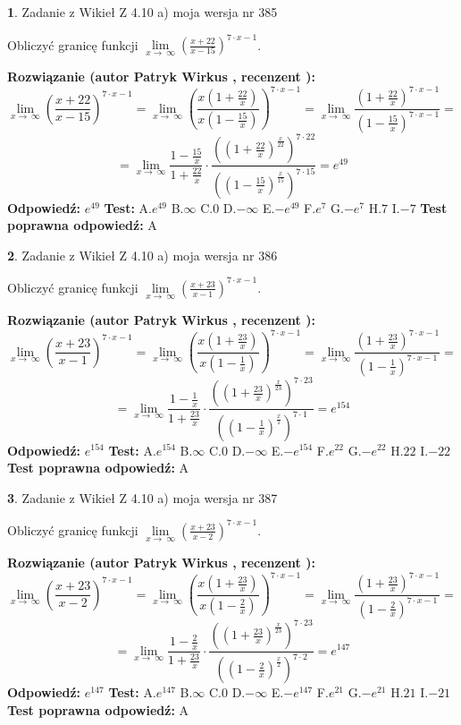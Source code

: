 \documentclass[12pt, a4paper]{article}
\theoremstyle{definition} %
\newtheorem{zad}{}
\newcommand{\zadStart}[1]{\begin{zad}#1\newline}
\newcommand{\zadStop}{\end{zad}}
\newcommand{\rozwStart}[2]{\noindent \textbf{Rozwiązanie (autor #1 , recenzent #2): }\newline}
\newcommand{\rozwStop}{\newline}
\newcommand{\odpStart}{\noindent \textbf{Odpowiedź:}\newline}
\newcommand{\odpStop}{\newline}
\newcommand{\testStart}{\noindent \textbf{Test:}\newline}
\newcommand{\testStop}{\newline}
\newcommand{\kluczStart}{\noindent \textbf{Test poprawna odpowiedź:}\newline}
\newcommand{\kluczStop}{\newline}
\begin{document}
\zadStart{Zadanie z Wikieł Z 4.10 a) moja wersja nr 385}

Obliczyć granicę funkcji  $\lim\limits_{x\to\ \infty}(\frac{x+22}{x-15})^{7\cdot x-1}$.
\zadStop
\rozwStart{Patryk Wirkus}{}
$$\lim\limits_{x\to\ \infty}(\frac{x+22}{x-15})^{7\cdot x-1} = \lim\limits_{x\to\ \infty}(\frac{x(1+\frac{22}{x})}{x(1-\frac{15}{x})})^{7\cdot x-1}=\lim\limits_{x\to\ \infty}\frac{(1+\frac{22}{x})^{7\cdot x-1}}{(1-\frac{15}{x})^{7\cdot x-1}}=$$
$$=\lim\limits_{x\to\ \infty}\frac{1-\frac{15}{x}}{1+\frac{22}{x}}\cdot\frac{((1+\frac{22}{x})^{\frac{x}{22}})^{7\cdot22}}{((1-\frac{15}{x})^{\frac{x}{15}})^{7\cdot15}}=e^{49}$$
\rozwStop
\odpStart
$e^{49}$
\odpStop
\testStart
A.$e^{49}$ B.$\infty$ C.$0$ D.$-\infty$ E.$-e^{49}$
F.$e^{7}$ G.$-e^{7}$
H.$7$
I.$-7$
\testStop
\kluczStart
A
\kluczStop



\zadStart{Zadanie z Wikieł Z 4.10 a) moja wersja nr 386}

Obliczyć granicę funkcji  $\lim\limits_{x\to\ \infty}(\frac{x+23}{x-1})^{7\cdot x-1}$.
\zadStop
\rozwStart{Patryk Wirkus}{}
$$\lim\limits_{x\to\ \infty}(\frac{x+23}{x-1})^{7\cdot x-1} = \lim\limits_{x\to\ \infty}(\frac{x(1+\frac{23}{x})}{x(1-\frac{1}{x})})^{7\cdot x-1}=\lim\limits_{x\to\ \infty}\frac{(1+\frac{23}{x})^{7\cdot x-1}}{(1-\frac{1}{x})^{7\cdot x-1}}=$$
$$=\lim\limits_{x\to\ \infty}\frac{1-\frac{1}{x}}{1+\frac{23}{x}}\cdot\frac{((1+\frac{23}{x})^{\frac{x}{23}})^{7\cdot23}}{((1-\frac{1}{x})^{\frac{x}{1}})^{7\cdot1}}=e^{154}$$
\rozwStop
\odpStart
$e^{154}$
\odpStop
\testStart
A.$e^{154}$ B.$\infty$ C.$0$ D.$-\infty$ E.$-e^{154}$
F.$e^{22}$ G.$-e^{22}$
H.$22$
I.$-22$
\testStop
\kluczStart
A
\kluczStop



\zadStart{Zadanie z Wikieł Z 4.10 a) moja wersja nr 387}

Obliczyć granicę funkcji  $\lim\limits_{x\to\ \infty}(\frac{x+23}{x-2})^{7\cdot x-1}$.
\zadStop
\rozwStart{Patryk Wirkus}{}
$$\lim\limits_{x\to\ \infty}(\frac{x+23}{x-2})^{7\cdot x-1} = \lim\limits_{x\to\ \infty}(\frac{x(1+\frac{23}{x})}{x(1-\frac{2}{x})})^{7\cdot x-1}=\lim\limits_{x\to\ \infty}\frac{(1+\frac{23}{x})^{7\cdot x-1}}{(1-\frac{2}{x})^{7\cdot x-1}}=$$
$$=\lim\limits_{x\to\ \infty}\frac{1-\frac{2}{x}}{1+\frac{23}{x}}\cdot\frac{((1+\frac{23}{x})^{\frac{x}{23}})^{7\cdot23}}{((1-\frac{2}{x})^{\frac{x}{2}})^{7\cdot2}}=e^{147}$$
\rozwStop
\odpStart
$e^{147}$
\odpStop
\testStart
A.$e^{147}$ B.$\infty$ C.$0$ D.$-\infty$ E.$-e^{147}$
F.$e^{21}$ G.$-e^{21}$
H.$21$
I.$-21$
\testStop
\kluczStart
A
\kluczStop
\end{document}
